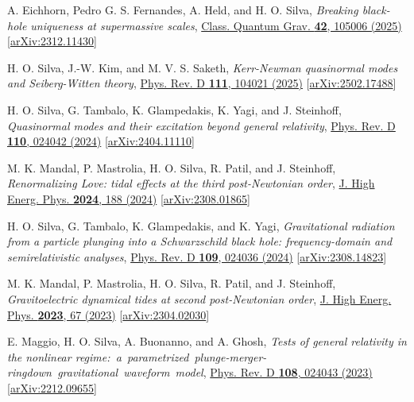 \documentclass[11pt]{article}
\begin{document}
\begin{etaremune}[
        start=\value{pubCounter},
        topsep=0pt,
        partopsep=0pt]
    \item A. Eichhorn, Pedro G. S. Fernandes, A. Held, and H. O. Silva,
    \emph{Breaking black-hole uniqueness at supermassive scales},
    \href{https://iopscience.iop.org/article/10.1088/1361-6382/add3b6}{Class. Quantum Grav. {\bf 42}, 105006 (2025)}
    [\href{https://arxiv.org/abs/2312.11430}{arXiv:2312.11430}]

    \item H. O. Silva, J.-W. Kim, and M. V. S. Saketh,
    \emph{Kerr-Newman quasinormal modes and Seiberg-Witten theory},
    \href{https://journals.aps.org/prd/abstract/10.1103/PhysRevD.111.104021}{Phys. Rev. D {\bf 111}, 104021 (2025)}
    [\href{https://arxiv.org/abs/2502.17488}{arXiv:2502.17488}]

    \item H. O. Silva, G. Tambalo, K. Glampedakis, K. Yagi, and J. Steinhoff,
    \emph{Quasinormal modes and their excitation beyond general relativity},
    \href{https://journals.aps.org/prd/abstract/10.1103/PhysRevD.110.024042}{Phys. Rev. D {\bf 110}, 024042 (2024)}
    [\href{https://arxiv.org/abs/2404.11110}{arXiv:2404.11110}]

    \item M. K. Mandal, P. Mastrolia, H. O. Silva, R. Patil, and J. Steinhoff,
    \emph{Renormalizing Love: tidal effects at the third post-Newtonian order},
    \href{https://link.springer.com/article/10.1007/JHEP02(2024)188}{J. High Energ. Phys. {\bf 2024}, 188 (2024)}
    [\href{https://arxiv.org/abs/2308.01865}{arXiv:2308.01865}]

    \item H. O. Silva, G. Tambalo, K. Glampedakis, and K. Yagi,
    \emph{Gravitational radiation from a particle plunging into a Schwarzschild black hole: frequency-domain and semirelativistic analyses},
    \href{https://journals.aps.org/prd/abstract/10.1103/PhysRevD.109.024036}{Phys. Rev. D {\bf 109}, 024036 (2024)}
    [\href{https://arxiv.org/abs/2308.14823}{arXiv:2308.14823}]

    \item M. K. Mandal, P. Mastrolia, H. O. Silva, R. Patil, and J. Steinhoff,
    \emph{Gravitoelectric dynamical tides at second post-Newtonian order},
    \href{https://link.springer.com/article/10.1007/JHEP11(2023)067}{J. High Energ. Phys. {\bf 2023}, 67 (2023)}
    [\href{https://arxiv.org/abs/2304.02030}{arXiv:2304.02030}]

    \item E. Maggio, H. O. Silva, A. Buonanno, and A. Ghosh,
    \emph{Tests of general relativity in the nonlinear regime:~a~parametrized~plunge-merger-ringdown~gravitational~waveform~model},
    \href{https://link.aps.org/doi/10.1103/PhysRevD.108.024043}{Phys. Rev. D {\bf 108}, 024043 (2023)}
    [\href{https://arxiv.org/abs/2212.09655}{arXiv:2212.09655}]


\end{etaremune}
\end{document}
